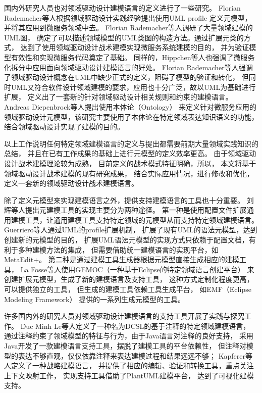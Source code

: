 国内外研究人员也对领域驱动设计建模语言的定义进行了一些研究。
Florian Rademacher等人\cite{rademacher2017towards}根据领域驱动设计实践经验提出使用UML profile
定义元模型，并将其应用到微服务领域中去。
Florian Rademacher等人调研了大量领域建模的UML图，
确定了可以描述领域模型的UML类图的构造方法。通过扩展元类的方式，
达到了使用领域驱动设计战术建模实现微服务系统建模的目的，
并为验证模型有效性和实现微服务代码奠定了基础。
同样的，Hippchen等人\cite{hippchen2019systematic}也强调了微服务化拆分中应用面向领域驱动设计建模语言的好处。
Florian Rademacher等人强调了领域驱动设计概念在UML中缺少正式的定义，阻碍了模型的验证和转化，
但同时UML又符合软件设计领域建模的要求，应用也十分广泛，故以UML为基础进行扩展，
定义出了一套新的针对领域驱动设计相关规则和约束的建模语言。
Andreas Diepenbrock等人\cite{diepenbrock2017ontology}提出使用本体论（Ontology）\cite{smith2003ontology}
来定义针对微服务应用的领域驱动设计元模型，该研究主要使用了本体论在特定领域表达知识语义的功能，
结合领域驱动设计实现了建模的目的。

以上工作说明任何特定领域建模语言的定义与提出都需要前期大量领域实践知识的总结，
并且在已有工作成果的基础上进行元模型的定义效率更高。
由于领域驱动设计战术建模理论较为成熟，
目前定义的战术模式特征明确，所以，
本文将基于领域驱动设计战术建模的现有研究成果，
结合实际应用情况，进行修改和优化，
定义一套新的领域驱动设计战术建模语言。


除了定义元模型来实现建模语言之外，提供支持建模语言的工具也十分重要。
刘辉等人\cite{刘辉2008元建模技术研究进展}提出元建模工具的实现主要分为两种途径。
第一种是使用配置文件扩展通用建模工具，让通用建模工具支持特定领域的元模型从而支持特定领域建模语言。
Guerriero等人\cite{guerriero2018streamgen}通过UML的profile扩展机制，
扩展了现有UML的语法元模型，达到创建新的元模型的目的，
扩展UML语法元模型的实现方式只依赖于配置文档，有利于多种建模方法的集成，
但需要借助统一建模语言的实现平台，如MetaEdit+\footnotemark[3]。
第二种是通过建模工具生成器根据元模型直接生成相应的建模工具，
La Fosse等人\cite{la2019towards}使用GEMOC（一种基于Eclipse的特定领域语言创建平台）
来创建扩展元模型，生成了新的建模语言及支持工具，
这种方式定制化程度更高，可以提供独立的工具，
但生成的建模工具依赖工具生成平台，
如EMF（Eclipse Modeling Framework）\footnotemark[4]
提供的一系列生成元模型的工具。

许多国内外的研究人员对领域驱动设计建模语言的支持工具开展了实践与探究工作。
Duc Minh Le等人\cite{le2018domain}定义了一种名为DCSL的基于注释的特定领域建模语言，
通过注释约束了领域模型的特征与行为，由于Java语言对注释的良好支持，
采用Java开发了一款建模语言支持工具，摆脱了建模工具的平台依赖性，
但注释对模型的表达不够直观，仅仅依靠注释来表达建模过程和结果远远不够；
Kapferer等人\cite{kapferer2020domain}定义了一种战略建模语言，
并提供了相应的编辑、验证和转换工具，重点关注上下文映射工作，
实现支持工具借助了PlantUML建模平台，
达到了可视化建模支持。


